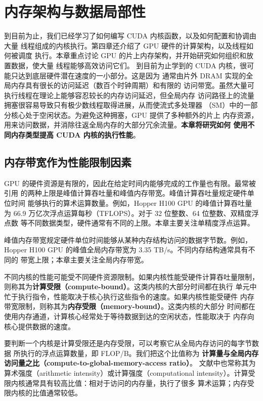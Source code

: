 \chapter{内存架构与数据局部性}
\label{chap:memory-architecture-and-data-locality}
\chaptercontents

\setcounter{footnote}{0}

到目前为止，我们已经学习了如何编写 CUDA 内核函数，以及如何配置和协调由大量
线程组成的内核执行。第四章还介绍了 GPU 硬件的计算架构，以及线程如何被调度
执行。本章重点讨论 GPU 的片上内存架构，并开始研究如何组织和放置数据，使大量
线程能够高效访问它们。
到目前为止学到的 CUDA 内核，很可能只达到底层硬件潜在速度的一小部分。这是因为
通常由片外 DRAM 实现的全局内存具有很长的访问延迟（数百个时钟周期）和有限的
访问带宽。虽然大量可执行线程在理论上能够容忍较长的内存访问延迟，但全局内存
访问路径上的流量拥塞很容易导致只有极少数线程取得进展，从而使流式多处理器
（SM）中的一部分核心处于空闲状态。为避免这种拥塞，GPU 提供了多种额外的片上
内存资源，用来访问数据，并消除往返全局内存的大部分冗余流量。\textbf{本章将研究如何
使用不同内存类型提高 CUDA 内核的执行性能}。

\section{内存带宽作为性能限制因素}
\label{sec:memory-bandwidth-performance-limiter}

GPU 的硬件资源是有限的，因此在给定时间内能够完成的工作量也有限。最常被引用
的两种上限是峰值计算吞吐量和峰值内存带宽。峰值计算吞吐量规定硬件单位时间
能够执行的算术运算数量。例如，Hopper H100 GPU 的峰值计算吞吐量为
66.9 万亿次浮点运算每秒（TFLOPS）。对于 32 位整数、64 位整数、双精度浮点数
等不同数据类型，硬件通常有不同的上限。本章主要关注单精度浮点运算。

峰值内存带宽规定硬件单位时间能够从某种内存结构访问的数据字节数。例如，
Hopper H100 GPU 的峰值全局内存带宽为 3.35 TB/s。不同内存结构通常具有不同的
带宽上限；本章主要关注全局内存带宽。

不同内核的性能可能受不同硬件资源限制。如果内核性能受硬件计算吞吐量限制，
则称其为\textbf{计算受限（compute-bound）}。这类内核的大部分时间都在执行
单元中忙于执行指令，性能取决于核心执行这些指令的速度。如果内核性能受硬件
内存带宽限制，则称其为\textbf{内存受限（memory-bound）}。这类内核的大部分
时间都在使用内存通道，计算核心经常处于等待数据到达的空闲状态，性能取决于
内存向核心提供数据的速度。

要判断一个内核是计算受限还是内存受限，可以考察它从全局内存访问的每字节数据
所执行的浮点运算数量，即 FLOP/B。我们把这个比值称为
\textbf{计算量与全局内存访问量之比（compute-to-global-memory-access ratio）}。
文献中也常称其为算术强度（arithmetic intensity）或计算强度（computational
intensity）。计算受限内核通常具有较高比值：相对于访问的内存量，执行了很多
算术运算；内存受限内核的比值通常较低。

